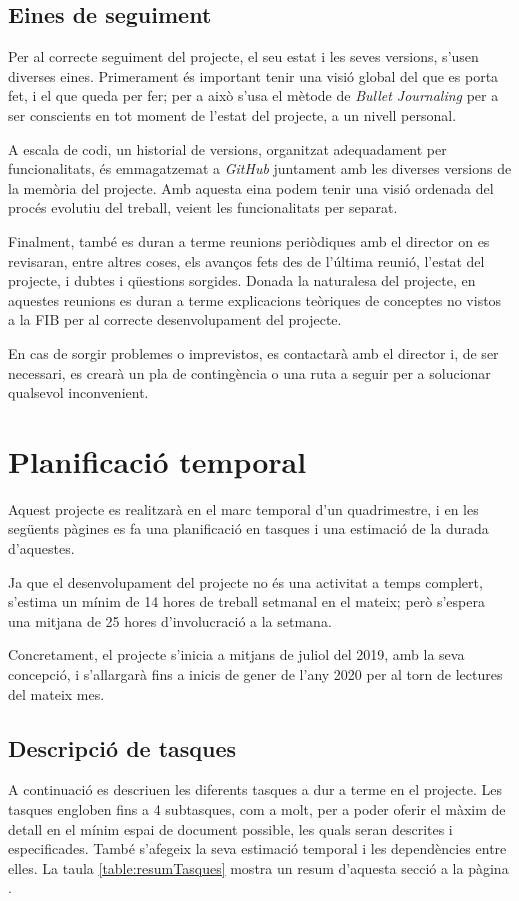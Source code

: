 \documentclass[a4paper]{report}
\begin{document}
	\subsection{Eines de seguiment}
	Per al correcte seguiment del projecte, el seu estat i les seves versions, s'usen diverses eines. Primerament és important tenir una visió global del que es porta fet, i el que queda per fer; per a això s'usa el mètode de \textit{Bullet Journaling} per a ser conscients en tot moment de l'estat del projecte, a un nivell personal. \par
	A escala de codi, un historial de versions, organitzat adequadament per funcionalitats, és emmagatzemat a \textit{GitHub} juntament amb les diverses versions de la memòria del projecte. Amb aquesta eina podem tenir una visió ordenada del procés evolutiu del treball, veient les funcionalitats per separat.\par
	Finalment, també es duran a terme reunions periòdiques amb el director on es revisaran, entre altres coses, els avanços fets des de l'última reunió, l'estat del projecte, i dubtes i qüestions sorgides. Donada la naturalesa del projecte, en aquestes reunions es duran a terme explicacions teòriques de conceptes no vistos a la FIB per al correcte desenvolupament del projecte.
	\par
	En cas de sorgir problemes o imprevistos, es contactarà amb el director i, de ser necessari, es crearà un pla de contingència o una ruta a seguir per a solucionar qualsevol inconvenient.
	 

	\section{Planificació temporal}
	Aquest projecte es realitzarà en el marc temporal d'un quadrimestre, i en les següents pàgines es fa una planificació en tasques i una estimació de la durada d'aquestes.\par 
	Ja que el desenvolupament del projecte no és una activitat a temps complert, s'estima un mínim de 14 hores de treball setmanal en el mateix; però s'espera una mitjana de 25 hores d'involucració a la setmana. \par 
	Concretament, el projecte s'inicia a mitjans de juliol del 2019, amb la seva concepció, i s'allargarà fins a inicis de gener de l'any 2020 per al torn de lectures del mateix mes.
	
	\subsection{Descripció de tasques}
	A continuació es descriuen les diferents tasques a dur a terme en el projecte. Les tasques engloben fins a 4 subtasques, com a molt, per a poder oferir el màxim de detall en el mínim espai de document possible, les quals seran descrites i especificades. També s'afegeix la seva estimació temporal i les dependències entre elles. La taula \ref{table:resumTasques} mostra un resum d'aquesta secció a la pàgina \pageref{table:resumTasques}.
\end{document}
